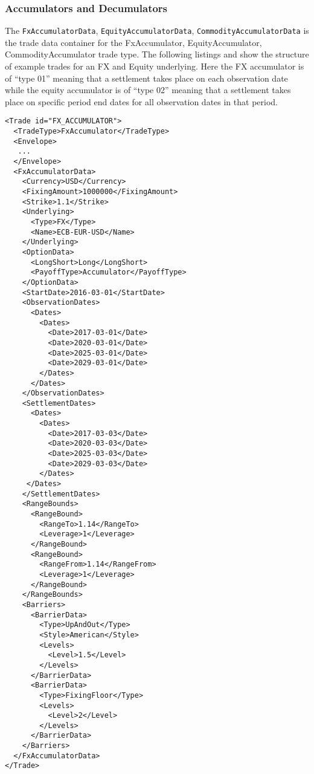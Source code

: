 \subsubsection{Accumulators and Decumulators}

The \verb+FxAccumulatorData+, \verb+EquityAccumulatorData+, \verb+CommodityAccumulatorData+ is the trade data container
for the FxAccumulator, EquityAccumulator, CommodityAccumulator trade type. The following listings and show the
structure of example trades for an FX and Equity underlying. Here the FX accumulator is of ``type 01'' meaning that a
settlement takes place on each observation date while the equity accumulator is of ``type 02'' meaning that a settlement
takes place on specific period end dates for all observation dates in that period.

\begin{verbatim}
<Trade id="FX_ACCUMULATOR">
  <TradeType>FxAccumulator</TradeType>
  <Envelope>
   ...
  </Envelope>
  <FxAccumulatorData>
    <Currency>USD</Currency>
    <FixingAmount>1000000</FixingAmount>
    <Strike>1.1</Strike>
    <Underlying>
      <Type>FX</Type>
      <Name>ECB-EUR-USD</Name>
    </Underlying>
    <OptionData>
      <LongShort>Long</LongShort>
      <PayoffType>Accumulator</PayoffType>
    </OptionData>
    <StartDate>2016-03-01</StartDate>
    <ObservationDates>
      <Dates>
        <Dates>
          <Date>2017-03-01</Date>
          <Date>2020-03-01</Date>
          <Date>2025-03-01</Date>
          <Date>2029-03-01</Date>
        </Dates>
      </Dates>
    </ObservationDates>
    <SettlementDates>
      <Dates>
        <Dates>
          <Date>2017-03-03</Date>
          <Date>2020-03-03</Date>
          <Date>2025-03-03</Date>
          <Date>2029-03-03</Date>
        </Dates>
     </Dates>
    </SettlementDates>
    <RangeBounds>
      <RangeBound>
        <RangeTo>1.14</RangeTo>
        <Leverage>1</Leverage>
      </RangeBound>
      <RangeBound>
        <RangeFrom>1.14</RangeFrom>
        <Leverage>1</Leverage>
      </RangeBound>
    </RangeBounds>
    <Barriers>
      <BarrierData>
        <Type>UpAndOut</Type>
        <Style>American</Style>
        <Levels>
          <Level>1.5</Level>
        </Levels>
      </BarrierData>
      <BarrierData>
        <Type>FixingFloor</Type>
        <Levels>
          <Level>2</Level>
        </Levels>
      </BarrierData>
    </Barriers>
  </FxAccumulatorData>
</Trade>
\end{verbatim}


